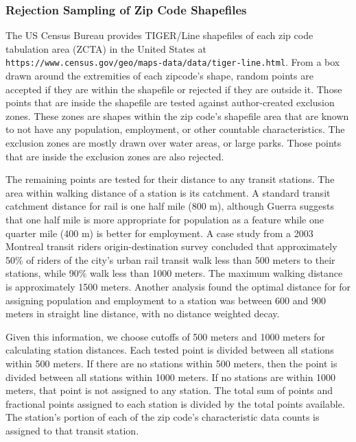 \documentclass{article}
\begin{document}
\subsubsection{Rejection Sampling of Zip Code Shapefiles}

The US Census Bureau provides TIGER/Line shapefiles of each zip code tabulation area (ZCTA) in the United States at \linebreak\texttt{https://www.census.gov/geo/maps-data/data/tiger-line.html}.  From a box drawn around the extremities of each zipcode's shape, random points are accepted if they are within the shapefile or rejected if they are outside it. Those points that are inside the shapefile are tested against author-created exclusion zones. These zones are shapes within the zip code's shapefile area that are known to not have any population, employment, or other countable characteristics. The exclusion zones are mostly drawn over water areas, or large parks. Those points that are inside the exclusion zones are also rejected.

The remaining points are tested for their distance to any transit stations. The area within walking distance of a station is its catchment. A standard transit catchment distance for rail is one half mile (800 m), although Guerra \cite{Guerra2012} suggests that one half mile is more appropriate for population as a feature while one quarter mile (400 m) is better for employment. A case study \cite{ElGeneidy2014} from a 2003 Montreal transit riders origin-destination survey concluded that approximately 50\% of riders of the city's urban rail transit walk less than 500 meters to their stations, while 90\% walk less than 1000 meters. The maximum walking distance is approximately 1500 meters. Another analysis \cite{Gutierrez2011} found the optimal distance for  for assigning population and employment to a station was between 600 and 900 meters in straight line distance, with no distance weighted decay. 

Given this information, we choose cutoffs of 500 meters and 1000 meters for calculating station distances. Each tested point is divided between all stations within 500 meters. If there are no stations within 500 meters, then the point is divided between all stations within 1000 meters. If no stations are within 1000 meters, that point is not assigned to any station. The total sum of points and fractional points assigned to each station is divided by the total points available. The station's portion of each of the zip code's characteristic data counts is assigned to that transit station. 
\end{document}
